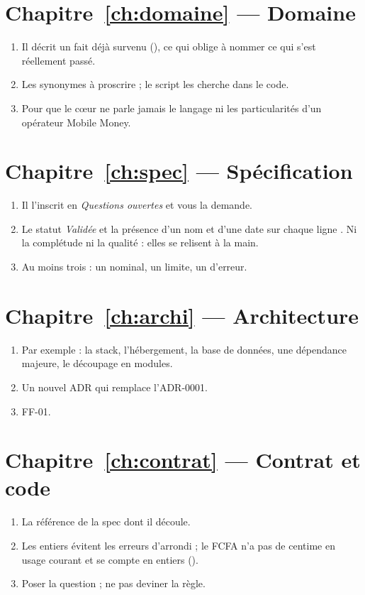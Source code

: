 \section*{Chapitre~\ref{ch:domaine} --- Domaine}
\begin{enumerate}[label=\sffamily\bfseries\color{leaf}Q\arabic*.,leftmargin=2.2em]
  \item Il décrit un fait déjà survenu (), ce qui oblige à nommer ce qui s'est réellement passé.
  \item Les synonymes à proscrire ; le script  les cherche dans le code.
  \item Pour que le cœur ne parle jamais le langage ni les particularités d'un opérateur Mobile Money.
\end{enumerate}
\section*{Chapitre~\ref{ch:spec} --- Spécification}
\begin{enumerate}[label=\sffamily\bfseries\color{leaf}Q\arabic*.,leftmargin=2.2em]
  \item Il l'inscrit en \emph{Questions ouvertes} et vous la demande.
  \item Le statut \emph{Validée} et la présence d'un nom et d'une date sur chaque ligne . Ni la complétude ni la qualité : elles se relisent à la main.
  \item Au moins trois : un nominal, un limite, un d'erreur.
\end{enumerate}
\section*{Chapitre~\ref{ch:archi} --- Architecture}
\begin{enumerate}[label=\sffamily\bfseries\color{leaf}Q\arabic*.,leftmargin=2.2em]
  \item Par exemple : la stack, l'hébergement, la base de données, une dépendance majeure, le découpage en modules.
  \item Un nouvel ADR qui remplace l'ADR-0001.
  \item FF-01.
\end{enumerate}
\section*{Chapitre~\ref{ch:contrat} --- Contrat et code}
\begin{enumerate}[label=\sffamily\bfseries\color{leaf}Q\arabic*.,leftmargin=2.2em]
  \item La référence  de la spec dont il découle.
  \item Les entiers évitent les erreurs d'arrondi ; le FCFA n'a pas de centime en usage courant et se compte en entiers ().
  \item Poser la question ; ne pas deviner la règle.
\end{enumerate}
